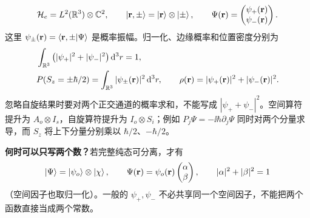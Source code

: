 \begin{equation}
  \mathcal{H}_e=L^2(\mathbb{R}^3)\otimes\mathbb{C}^2,\qquad
  \left|\mathbf r,\pm\right\rangle=\left|\mathbf r\right\rangle\otimes\left|\pm\right\rangle,\qquad
  \Psi(\mathbf r)=\begin{pmatrix}\psi_+(\mathbf r)\\\psi_-(\mathbf r)\end{pmatrix}.
\end{equation}
这里 $\psi_\pm(\mathbf r)=\left\langle \mathbf r,\pm \middle| \Psi \right\rangle$ 是概率振幅。归一化、边缘概率和位置密度分别为
\begin{align}
  &\int_{\mathbb{R}^3}\left(|\psi_+|^2+|\psi_-|^2\right)\mathop{}\!\mathrm{d}^3r=1,\\
  &P(S_z=\pm\hbar/2)=\int_{\mathbb{R}^3}|\psi_\pm(\mathbf r)|^2\mathop{}\!\mathrm{d}^3r,\qquad
  \rho(\mathbf r)=|\psi_+(\mathbf r)|^2+|\psi_-(\mathbf r)|^2.
\end{align}
忽略自旋结果时要对两个正交通道的概率求和，不能写成 $|\psi_++\psi_-|^2$。空间算符提升为 $A_o\otimes I_s$，自旋算符提升为 $I_o\otimes S_i$；例如 $P_j\Psi=-\ii\hbar\partial_j\Psi$ 同时对两个分量求导，而 $S_z$ 将上下分量分别乘以 $\hbar/2$、$-\hbar/2$。

\textbf{何时可以只写两个数？}若完整纯态可分离，才有
\begin{equation}
  \left|\Psi\right\rangle=\left|\psi_o\right\rangle\otimes\left|\chi\right\rangle,\qquad
  \Psi(\mathbf r)=\psi_o(\mathbf r)\begin{pmatrix}\alpha\\\beta\end{pmatrix},
  \qquad |\alpha|^2+|\beta|^2=1
\end{equation}
（空间因子也取归一化）。一般的 $\psi_+,\psi_-$ 不必共享同一个空间因子，不能把两个函数直接当成两个常数。


